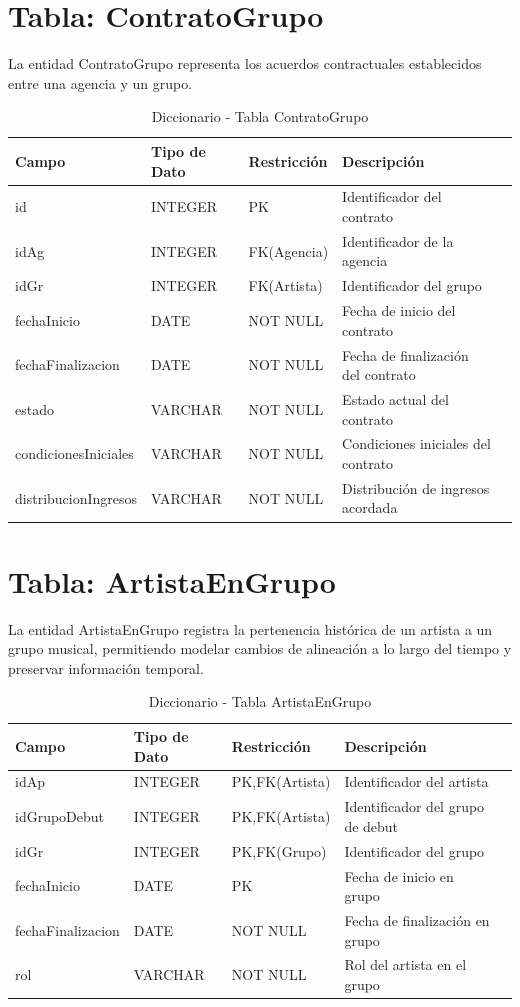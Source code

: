 \documentclass[12pt,a4paper,spanish,oneside]{report}
\begin{document}
\section{Tabla: ContratoGrupo}
La entidad ContratoGrupo representa los acuerdos contractuales establecidos entre una
agencia y un grupo.
\begin{table}[H]
\centering
\caption{Diccionario - Tabla ContratoGrupo}
\begin{tabular}{|l|l|l|l|l|}
\hline
\textbf{Campo} & \textbf{Tipo de Dato} & \textbf{Restricción} & \textbf{Descripción} \\
\hline
id & INTEGER & PK & Identificador del contrato \\
\hline
idAg & INTEGER & FK(Agencia) & Identificador de la agencia \\
\hline
idGr & INTEGER & FK(Artista) & Identificador del grupo  \\
\hline
fechaInicio & DATE & NOT NULL & Fecha de inicio del contrato \\
\hline
fechaFinalizacion & DATE & NOT NULL & Fecha de finalización del contrato \\
\hline
estado & VARCHAR & NOT NULL & Estado actual del contrato \\
\hline
condicionesIniciales & VARCHAR & NOT NULL & Condiciones iniciales del contrato \\
\hline
distribucionIngresos & VARCHAR & NOT NULL & Distribución de ingresos acordada \\
\hline
\end{tabular}
\end{table}

\section{Tabla: ArtistaEnGrupo}
La entidad ArtistaEnGrupo registra la pertenencia histórica de un artista a un grupo
musical, permitiendo modelar cambios de alineación a lo largo del tiempo y preservar
información temporal.
\begin{table}[H]
\centering
\caption{Diccionario - Tabla ArtistaEnGrupo}
\begin{tabular}{|l|l|l|l|l|}
\hline
\textbf{Campo} & \textbf{Tipo de Dato} & \textbf{Restricción} & \textbf{Descripción} \\
\hline
idAp & INTEGER & PK,FK(Artista) & Identificador del artista \\
\hline
idGrupoDebut & INTEGER & PK,FK(Artista) & Identificador del grupo de debut  \\
\hline
idGr & INTEGER & PK,FK(Grupo) & Identificador del grupo  \\
\hline
fechaInicio & DATE & PK & Fecha de inicio en grupo \\
\hline
fechaFinalizacion & DATE & NOT NULL & Fecha de finalización en grupo \\
\hline
rol & VARCHAR & NOT NULL & Rol del artista en el grupo \\
\hline
\end{tabular}
\end{table}
\end{document}
